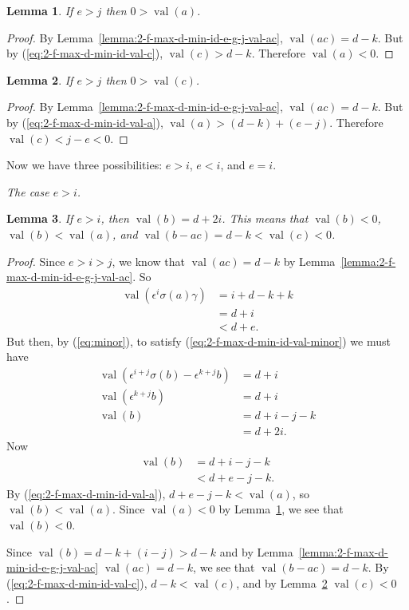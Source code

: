 \documentclass{amsart}
\newtheorem{lemma}{Lemma}[subsection]
\theoremstyle{definition}
\def\e{\epsilon}
\def\val{\mathop{\mathrm{val}}}
\def\s{\sigma}
\newcommand\subsubsubsection[1]{\vspace{0.5em}\begin{paragraph}{}\noindent \normalfont\large\itshape #1. \end{paragraph}\vspace{0.5em}}
\begin{document}
  \begin{lemma}
    \label{lemma:2-f-max-d-min-id-e-g-j-val-a}
    If $e > j$ then $0 > \val(a)$.
  \end{lemma}
  \begin{proof}
    By Lemma~\ref{lemma:2-f-max-d-min-id-e-g-j-val-ac}, $\val(ac) = d - k$.  But
    by (\ref{eq:2-f-max-d-min-id-val-c}), $\val(c) > d - k$.  Therefore $\val(a)
    < 0$.
  \end{proof}
  \begin{lemma}
    \label{lemma:2-f-max-d-min-id-e-g-j-val-c}
    If $e > j$ then $0 > \val(c)$.
  \end{lemma}
  \begin{proof}
    By Lemma~\ref{lemma:2-f-max-d-min-id-e-g-j-val-ac}, $\val(ac) = d - k$.  But
    by (\ref{eq:2-f-max-d-min-id-val-a}), $\val(a) > (d - k) + (e-j)$.  Therefore
    $\val(c) < j - e < 0$.
  \end{proof}

  Now we have three possibilities: $e > i$, $e < i$, and $e = i$.

  \subsubsubsection{The case $e > i$}

  \begin{lemma}
    \label{lemma:2-f-max-d-min-id-e-g-i-val-b}
    If $e > i$, then $\val(b) = d + 2i$.  This means that $\val(b) < 0$,
    $\val(b) < \val(a)$, and $\val(b-ac) = d-k < \val(c) < 0$.
  \end{lemma}
  \begin{proof}
    Since $e > i > j$, we know that $\val(ac) = d - k$ by
    Lemma~\ref{lemma:2-f-max-d-min-id-e-g-j-val-ac}.  So
    \begin{align*}
      \val(\e^i\s(a)\gamma) &= i + d - k + k \\
      &= d + i \\
      &< d + e.
    \end{align*}
    But then, by (\ref{eq:minor}), to satisfy
    (\ref{eq:2-f-max-d-min-id-val-minor}) we must have
    \begin{align*}
      \val(\e^{i+j}\s(b) - \e^{k+j}b) &= d + i \\
      \val(\e^{k+j}b) &= d + i\\
      \val(b) &= d + i - j - k \\
              &= d + 2i.
    \end{align*}
    Now \begin{align*}
      \val(b) &= d + i - j - k \\
              &< d + e - j - k.
    \end{align*}
    By (\ref{eq:2-f-max-d-min-id-val-a}), $d + e - j - k < \val(a)$, so
    $\val(b) < \val(a)$.  Since $\val(a) < 0$ by
    Lemma~\ref{lemma:2-f-max-d-min-id-e-g-j-val-a}, we see that $\val(b) < 0$.

    Since $\val(b) = d - k + (i - j) > d-k$ and by
    Lemma~\ref{lemma:2-f-max-d-min-id-e-g-j-val-ac} $\val(ac) = d - k$, we see
    that $\val(b-ac) = d-k$.  By (\ref{eq:2-f-max-d-min-id-val-c}), $d-k <
    \val(c)$, and by Lemma~\ref{lemma:2-f-max-d-min-id-e-g-j-val-c} $\val(c) <
    0$.
  \end{proof}
\end{document}
